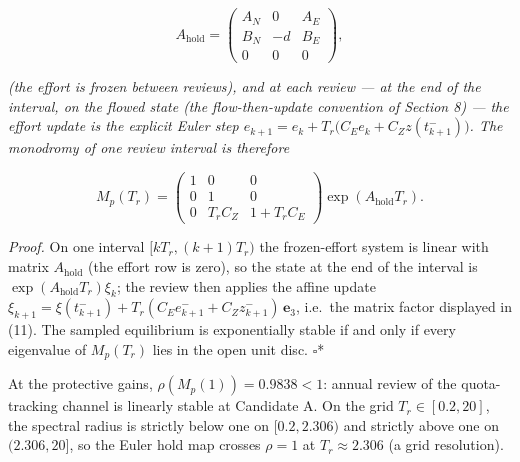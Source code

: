 \documentclass[11pt]{article}
\begin{document}
\[A_{\mathrm{hold}} = \begin{pmatrix} A_N & 0 & A_E \\ B_N & -d & B_E \\ 0 & 0 & 0 \end{pmatrix},\]

\emph{(the effort is frozen between reviews), and at each review --- at
the end of the interval, on the flowed state (the flow-then-update
convention of Section 8) --- the effort update is the explicit Euler
step \(e_{k+1} = e_k + T_r\big(C_E e_k + C_Z z(t_{k+1}^-)\big)\). The
monodromy of one review interval is therefore}

\[M_p(T_r) = \begin{pmatrix} 1 & 0 & 0 \\ 0 & 1 & 0 \\ 0 & T_r C_Z & 1 + T_r C_E \end{pmatrix} \exp(A_{\mathrm{hold}} T_r). \tag{11}\]

\emph{Proof.} On one interval \([kT_r, (k+1)T_r)\) the frozen-effort
system is linear with matrix \(A_{\mathrm{hold}}\) (the effort row is
zero), so the state at the end of the interval is
\(\exp(A_{\mathrm{hold}}T_r)\xi_k\); the review then applies the affine
update
\(\xi_{k+1} = \xi(t_{k+1}^-) + T_r(C_E e_{k+1}^- + C_Z z_{k+1}^-)\,\mathbf{e}_3\),
i.e.~the matrix factor displayed in (11). The sampled equilibrium is
exponentially stable if and only if every eigenvalue of \(M_p(T_r)\)
lies in the open unit disc. \ensuremath{\square}*

At the protective gains, \(\rho(M_p(1)) = 0.9838 < 1\): annual review of
the quota-tracking channel is linearly stable at Candidate A. On the
grid \(T_r \in [0.2, 20]\), the spectral radius is strictly below one on
\([0.2, 2.306)\) and strictly above one on \((2.306, 20]\), so the Euler
hold map crosses \(\rho = 1\) at \(T_r \approx 2.306\) (a grid
resolution).
\end{document}
